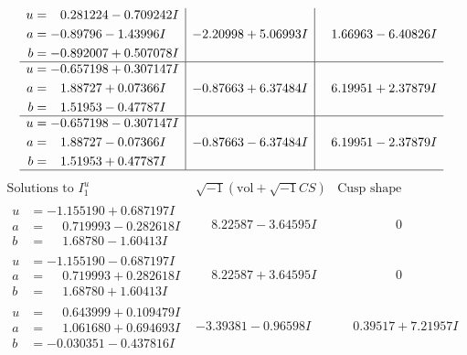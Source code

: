 \documentclass[1p]{elsarticle_modified}
\theoremstyle{definition}
\newcommand{\I}{\sqrt{-1}}
\begin{document}
$$\begin{array}{c|c|c}
\begin{aligned}
u &= \phantom{-}0.281224 - 0.709242 I \\
a &= -0.89796 - 1.43996 I \\
b &= -0.892007 + 0.507078 I\end{aligned}
 & -2.20998 + 5.06993 I & \phantom{-}1.66963 - 6.40826 I \\ \hline\begin{aligned}
u &= -0.657198 + 0.307147 I \\
a &= \phantom{-}1.88727 + 0.07366 I \\
b &= \phantom{-}1.51953 - 0.47787 I\end{aligned}
 & -0.87663 + 6.37484 I & \phantom{-}6.19951 + 2.37879 I \\ \hline\begin{aligned}
u &= -0.657198 - 0.307147 I \\
a &= \phantom{-}1.88727 - 0.07366 I \\
b &= \phantom{-}1.51953 + 0.47787 I\end{aligned}
 & -0.87663 - 6.37484 I & \phantom{-}6.19951 - 2.37879 I\\
 \hline 
 \end{array}$$\newpage$$\begin{array}{c|c|c}  
\text{Solutions to }I^u_{1}& \I (\text{vol} + \sqrt{-1}CS) & \text{Cusp shape}\\
 \hline 
\begin{aligned}
u &= -1.155190 + 0.687197 I \\
a &= \phantom{-}0.719993 - 0.282618 I \\
b &= \phantom{-}1.68780 - 1.60413 I\end{aligned}
 & \phantom{-}8.22587 - 3.64595 I & \phantom{-0.000000 } 0 \\ \hline\begin{aligned}
u &= -1.155190 - 0.687197 I \\
a &= \phantom{-}0.719993 + 0.282618 I \\
b &= \phantom{-}1.68780 + 1.60413 I\end{aligned}
 & \phantom{-}8.22587 + 3.64595 I & \phantom{-0.000000 } 0 \\ \hline\begin{aligned}
u &= \phantom{-}0.643999 + 0.109479 I \\
a &= \phantom{-}1.061680 + 0.694693 I \\
b &= -0.030351 - 0.437816 I\end{aligned}
 & -3.39381 - 0.96598 I & \phantom{-}0.39517 + 7.21957 I \\ \hline\begin{aligned}

\end{aligned}
\end{array}$$
\end{document}
